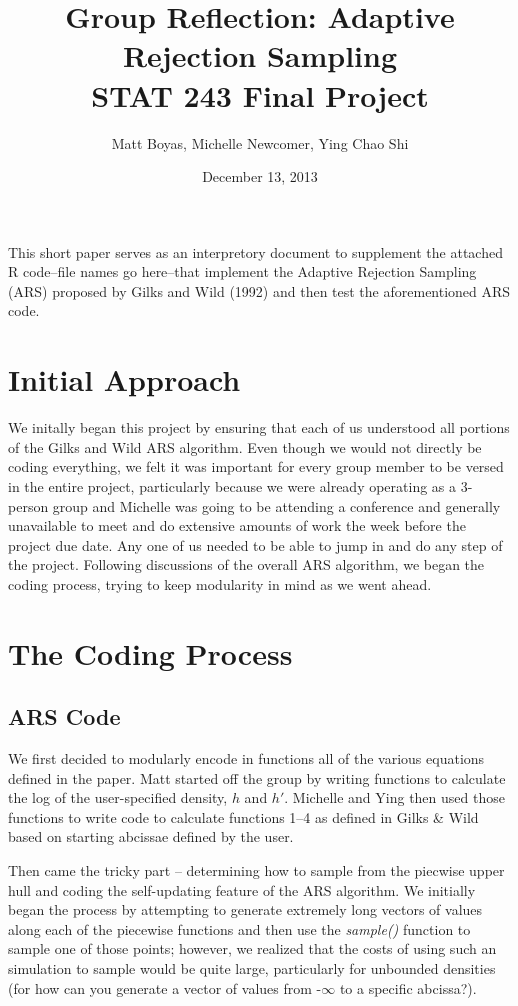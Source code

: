 \documentclass{article}
\begin{document}
\title{Group Reflection: Adaptive Rejection Sampling\\STAT 243 Final Project}
\author{Matt Boyas, Michelle Newcomer, Ying Chao Shi}

\date{December 13, 2013}
\maketitle
This short paper serves as an interpretory document to supplement the attached R code--file names go here--that implement the Adaptive Rejection Sampling (ARS) proposed by Gilks and Wild (1992) and then test the aforementioned ARS code.
\section{Initial Approach}
We initally began this project by ensuring that each of us understood all portions of the Gilks and Wild ARS algorithm.  Even though we would not directly be coding everything, we felt it was important for every group member to be versed in the entire project, particularly because we were already operating as a 3-person group and Michelle was going to be attending a conference and generally unavailable to meet and do extensive amounts of work the week before the project due date.  Any one of us needed to be able to jump in and do any step of the project.  Following discussions of the overall ARS algorithm, we began the coding process, trying to keep modularity in mind as we went ahead. 
 
\section{The Coding Process}
\subsection{ARS Code}
We first decided to modularly encode in functions all of the various equations defined in the paper.  Matt started off the group by writing functions to calculate the log of the user-specified density, $h$ and $h'$.  Michelle and Ying then used those functions to write code to calculate functions 1--4 as defined in Gilks \& Wild based on starting abcissae defined by the user. 

Then came the tricky part -- determining how to sample from the piecwise upper hull and coding the self-updating feature of the ARS algorithm.  We initially began the process by attempting to generate extremely long vectors of values along each of the piecewise functions and then use the \textit{sample()} function to sample one of those points; however, we realized that the costs of using such an simulation to sample would be quite large, particularly for unbounded densities (for how can you generate a vector of values from -$\infty$ to a specific abcissa?).  
\end{document}
